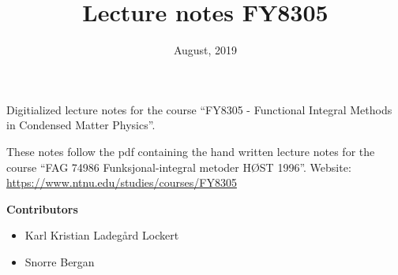 \documentclass{article}
\title{Lecture notes FY8305}
\date{August, 2019}
\theoremstyle{definition}
\newcommand{\contribs}{%
\begin{center}
\Large 
\textbf{Contributors}
\end{center}


\begin{itemize}
\item Karl Kristian Ladegård Lockert
\item Snorre Bergan
\end{itemize}

}
\begin{document}
\maketitle
Digitialized lecture notes for the course ``FY8305 - Functional Integral Methods in Condensed Matter Physics''.

These notes follow the pdf containing the hand written lecture notes for the course ``FAG 74986 Funksjonal-integral metoder HØST 1996''.
Website: \href{https://www.ntnu.edu/studies/courses/FY8305}{https://www.ntnu.edu/studies/courses/FY8305}
\contribs
\tableofcontents










%
%












%
%
%
%
%
%
%
%
\end{document}
